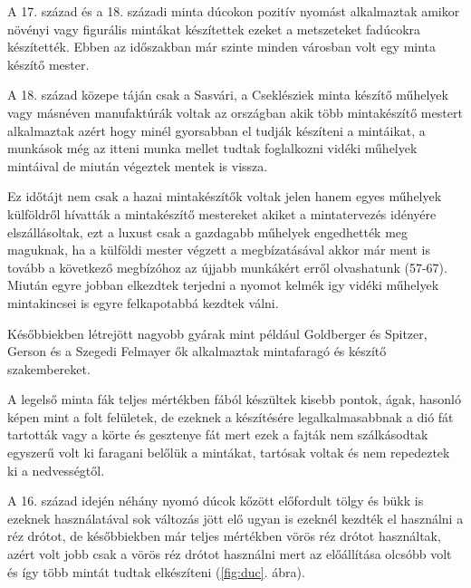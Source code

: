 A 17. század és a 18. századi minta dúcokon pozitív nyomást alkalmaztak amikor növényi vagy figurális mintákat készítettek ezeket a metszeteket fadúcokra készítették. Ebben az időszakban már szinte minden városban volt egy minta készítő mester.

A 18. század közepe táján csak a Sasvári, a Cseklésziek minta készítő műhelyek vagy másnéven manufaktúrák  voltak az országban akik több mintakészítő mestert alkalmaztak azért hogy minél gyorsabban el tudják készíteni a mintáikat, a munkások még az itteni munka mellet tudtak foglalkozni vidéki műhelyek mintáival de miután végeztek mentek is vissza. 

Ez időtájt nem csak a hazai mintakészítők voltak jelen hanem egyes műhelyek külföldről hívatták a mintakészítő mestereket akiket a mintatervezés idényére elszállásoltak, ezt a luxust csak a gazdagabb műhelyek engedhették meg maguknak, ha a külföldi mester végzett a megbízatásával akkor már ment is tovább a következő megbízóhoz az újjabb munkákért erről olvashatunk \cite{domonkos1981magyarorszagi} (57-67).
Miután egyre jobban elkezdtek terjedni a nyomot kelmék igy vidéki műhelyek mintakincsei is egyre felkapotabbá kezdtek válni.

Későbbiekben létrejött nagyobb gyárak mint például Goldberger és Spitzer, Gerson és a Szegedi Felmayer ők alkalmaztak mintafaragó és készítő szakembereket.

A legelső minta fák teljes mértékben fából készültek kisebb pontok, ágak, hasonló képen mint a folt felületek, de ezeknek a készítésére legalkalmasabbnak a dió fát tartották vagy a körte és gesztenye fát mert ezek a fajták nem szálkásodtak egyszerű volt ki faragani belőlük a mintákat, tartósak voltak és nem repedeztek ki a nedvességtől.

A 16. század idején néhány nyomó dúcok kőzött előfordult tölgy és bükk is ezeknek használatával sok változás jött elő ugyan is ezeknél kezdték el használni a réz drótot, de későbbiekben már teljes mértékben vörös réz drótot használtak, azért volt jobb csak a vörös réz drótot használni mert az előállítása olcsóbb volt és így több mintát tudtak elkészíteni (\ref{fig:duc}. ábra).

